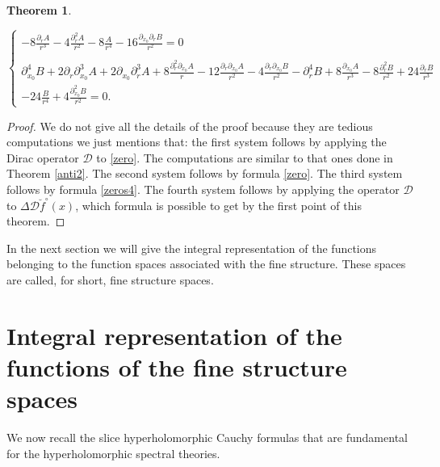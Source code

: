 \documentclass[reqno,11pt]{amsart}
\numberwithin{equation}{section}
\newtheorem{theorem}{Theorem}[section]
\theoremstyle{definition}
\begin{document}
\begin{theorem}
\begin{itemize}
\[\begin{cases}
- 8 \frac{\partial_r A}{r^3}-4 \frac{\partial_r^2 A}{r^2}- 8\frac{A}{r^4}-16 \frac{\partial_{x_0}\partial_r B}{r^2}=0\\
\\
\partial_{x_0}^4B+2 \partial_r \partial_{x_0}^3A+2 \partial_{x_0}\partial_r^3 A+ 8 \frac{\partial_r^2 \partial_{x_0}A}{r}-12 \frac{\partial_r \partial_{x_0}A}{r^2}-4 \frac{\partial_r \partial_{x_0}B}{r^2}- \partial_r^4B+8 \frac{\partial_{x_0}A}{r^3}-8 \frac{\partial_{r}^2B}{r^2}+24 \frac{\partial_r B}{r^3}\\
-24 \frac{B}{r^4}+4 \frac{\partial_{x_0}^2B}{r^2}=0.
\end{cases}
\]
\end{itemize}
\end{theorem}
\begin{proof}
We do not give all the details of the proof because they are tedious computations we just mentions that:
the first system follows by applying the Dirac operator $ \mathcal{D}$ to \eqref{zero}. The computations are similar to that ones done in Theorem \ref{anti2}.
The second system follows by formula \eqref{zero}.
 The third system follows by formula \eqref{zeros4}.
 The fourth system follows by applying the operator $ \mathcal{D}$ to $ \Delta \mathcal{D}\breve{f}^{\circ}(x)$, which formula is possible to get by the first point of this theorem.
\end{proof}

In the next section we will give the integral representation of the functions
belonging to the function spaces associated with the fine structure.
These spaces are called, for short, fine structure spaces.

\section{Integral representation of the functions of the fine structure spaces}\label{INTREP}

We now recall the slice hyperholomorphic Cauchy formulas that are fundamental for the hyperholomorphic spectral theories.
\end{document}
